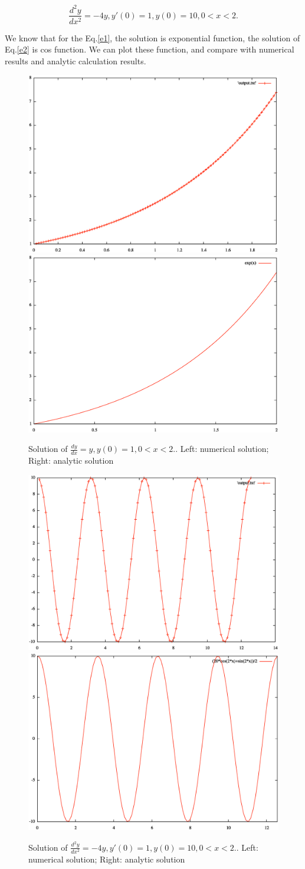 \documentclass{article}
\begin{document}
\begin{equation}\label{e2}
\frac{d^2y}{dx^2} = -4y, y'(0) = 1, y(0) = 10, 0 < x < 2.
\end{equation}

We know that for the Eq.\ref{e1}, the solution is exponential function, the solution of Eq.\ref{e2} is cos function. We can plot these function, and compare with numerical results and analytic calculation results.

\begin{figure}[H]\centering
\includegraphics[width=.49\textwidth]{output_exp.eps}
\includegraphics[width=.49\textwidth]{asol.eps}
\caption{Solution of $\frac{dy}{dx} = y, y(0) = 1, 0 < x < 2.$. Left: numerical solution; Right: analytic solution}
\label{figd}
\end{figure}

\begin{figure}[H]\centering
\includegraphics[width=.49\textwidth]{output_cos.eps}
\includegraphics[width=.49\textwidth]{as_cos.eps}
\caption{Solution of $\frac{d^2y}{dx^2} = -4y, y'(0) = 1, y(0) = 10, 0 < x < 2.$. Left: numerical solution; Right: analytic solution}
\label{figd2}
\end{figure}
\end{document}
